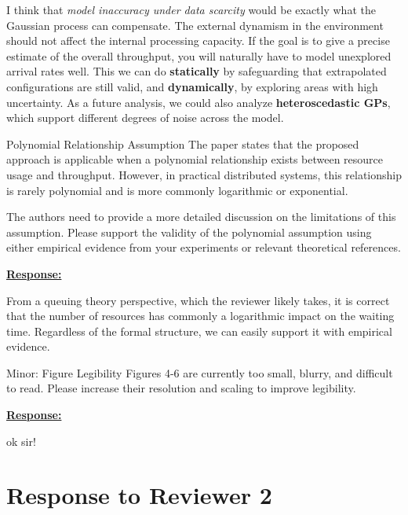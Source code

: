 \documentclass{article}
\newcommand{\Response}[1][]{%
    \noindent\underline{\textbf{Response:}}\par\vspace{0.2cm}%
    #1\par\vspace{0.6cm}%
}
\begin{document}
I think that \textit{model inaccuracy under data scarcity} would be exactly what the Gaussian process can compensate. The external dynamism in the environment should not affect the internal processing capacity. If the goal is to give a precise estimate of the overall throughput, you will naturally have to model unexplored arrival rates well. This we can do \textbf{statically} by safeguarding that extrapolated configurations are still valid, and \textbf{dynamically}, by exploring areas with high uncertainty. As a future analysis, we could also analyze \textbf{heteroscedastic GPs}, which support different degrees of noise across the model.


\begin{cmt}{Polynomial Relationship Assumption}{}
The paper states that the proposed approach is applicable when a polynomial relationship exists between resource usage and throughput. However, in practical distributed systems, this relationship is rarely polynomial and is more commonly logarithmic or exponential. 

The authors need to provide a more detailed discussion on the limitations of this assumption. Please support the validity of the polynomial assumption using either empirical evidence from your experiments or relevant theoretical references.
\end{cmt}

\Response

From a queuing theory perspective, which the reviewer likely takes, it is correct that the number of resources has commonly a logarithmic impact on the waiting time. Regardless of the formal structure, we can easily support it with empirical evidence.


\begin{cmt}{Minor: Figure Legibility}{}
Figures 4-6 are currently too small, blurry, and difficult to read. Please increase their resolution and scaling to improve legibility.
\end{cmt}
\Response

ok sir!

\newpage
\section{Response to Reviewer 2}
\end{document}
